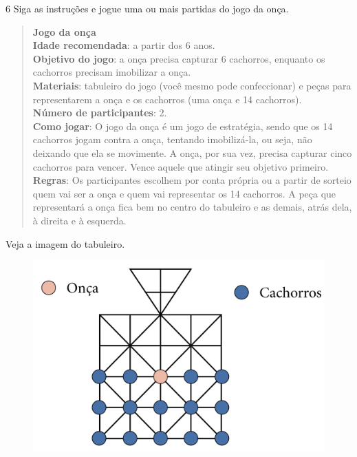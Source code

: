 
\pagebreak
\num{6} Siga as instruções e jogue uma ou mais partidas do jogo da onça.

\begin{quote}
\textbf{Jogo da onça}\\
\textbf{Idade recomendada}: a partir dos 6 anos.\\
\textbf{Objetivo do jogo}: a onça precisa capturar 6 cachorros, enquanto
os cachorros precisam imobilizar a onça.\\
\textbf{Materiais}: tabuleiro do jogo (você mesmo pode confeccionar) e
peças para representarem a onça e os cachorros (uma onça e 14
cachorros).\\
\textbf{Número de participantes}: 2.\\
\textbf{Como jogar}: O jogo da onça é um jogo de estratégia, sendo que
os 14 cachorros jogam contra a onça, tentando imobilizá-la, ou seja, não
deixando que ela se movimente. A onça, por sua vez, precisa capturar
cinco cachorros para vencer. Vence aquele que atingir seu objetivo
primeiro.\\
\textbf{Regras}: Os participantes escolhem por conta própria ou a partir
de sorteio quem vai ser a onça e quem vai representar os 14 cachorros. A
peça que representará a onça fica bem no centro do tabuleiro e as
demais, atrás dela, à direita e à esquerda.
\end{quote}

Veja a imagem do tabuleiro.

\begin{figure}[htpb!]
\includegraphics[width=\textwidth]{../ilustracoes/ART5/SAEB_5ANO_ART_FIGURA16.png}
\end{figure}

